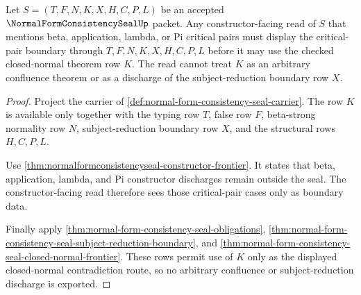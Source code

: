 \begin{theorem}
\label{thm:normal-form-consistency-seal-critical-pair-obligation}
Let $S=(T,F,N,K,X,H,C,P,L)$ be an accepted
$\NormalFormConsistencySealUp$ packet. Any constructor-facing read of $S$ that
mentions beta, application, lambda, or Pi critical pairs must display the
critical-pair boundary through $T,F,N,K,X,H,C,P,L$ before it may use the
checked closed-normal theorem row $K$. The read cannot treat $K$ as an
arbitrary confluence theorem or as a discharge of the subject-reduction
boundary row $X$.
\end{theorem}
\begin{proof}
Project the carrier of
\autoref{def:normal-form-consistency-seal-carrier}. The row $K$ is available
only together with the typing row $T$, false row $F$, beta-strong normality
row $N$, subject-reduction boundary row $X$, and the structural rows
$H,C,P,L$.

Use \autoref{thm:normalformconsistencyseal-constructor-frontier}. It states
that beta, application, lambda, and Pi constructor discharges remain outside
the seal. The constructor-facing read therefore sees those critical-pair
cases only as boundary data.

Finally apply
\autoref{thm:normal-form-consistency-seal-obligations},
\autoref{thm:normal-form-consistency-seal-subject-reduction-boundary}, and
\autoref{thm:normal-form-consistency-seal-closed-normal-frontier}. These rows
permit use of $K$ only as the displayed closed-normal contradiction route, so
no arbitrary confluence or subject-reduction discharge is exported.
\end{proof}

